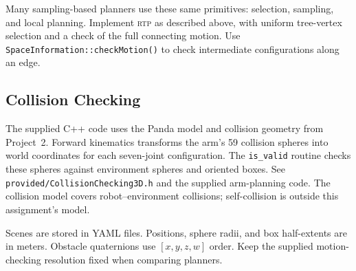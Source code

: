 \documentclass{comp450}
\begin{document}
Many sampling-based planners use these same primitives: selection, sampling, and local planning.
Implement \textsc{rtp} as described above, with uniform tree-vertex selection and a check of the full connecting motion.
Use \texttt{SpaceInformation::checkMotion()} to check intermediate configurations along an edge.

\subsection*{Collision Checking}
The supplied C++ code uses the Panda model and collision geometry from Project~2.
Forward kinematics transforms the arm's 59 collision spheres into world coordinates for each seven-joint configuration.
The \texttt{is\_valid} routine checks these spheres against environment spheres and oriented boxes.
See \texttt{provided/CollisionChecking3D.h} and the supplied arm-planning code.
The collision model covers robot--environment collisions; self-collision is outside this assignment's model.

Scenes are stored in YAML files.
Positions, sphere radii, and box half-extents are in meters.
Obstacle quaternions use $[x,y,z,w]$ order.
Keep the supplied motion-checking resolution fixed when comparing planners.
\end{document}
